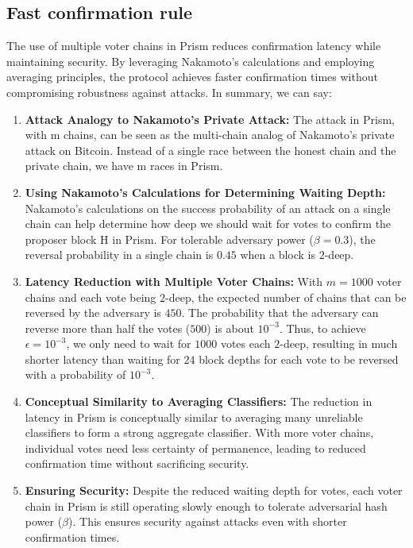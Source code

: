 \subsection{Fast confirmation rule}
The use of multiple voter chains in Prism reduces confirmation latency while maintaining security. By leveraging Nakamoto's calculations and employing averaging principles, the protocol achieves faster confirmation times without compromising robustness against attacks. In summary, we can say:
\begin{enumerate}
    \item \textbf{Attack Analogy to Nakamoto's Private Attack:} The attack in Prism, with m chains, can be seen as the multi-chain analog of Nakamoto's private attack on Bitcoin. Instead of a single race between the honest chain and the private chain, we have m races in Prism.
    \item \textbf{Using Nakamoto's Calculations for Determining Waiting Depth:} Nakamoto's calculations on the success probability of an attack on a single chain can help determine how deep we should wait for votes to confirm the proposer block H in Prism. For tolerable adversary power ($\beta = 0.3$), the reversal probability in a single chain is $0.45$ when a block is $2$-deep.
    \item \textbf{Latency Reduction with Multiple Voter Chains:} With $m = 1000$ voter chains and each vote being $2$-deep, the expected number of chains that can be reversed by the adversary is $450$. The probability that the adversary can reverse more than half the votes ($500$) is about $10^{-3}$. Thus, to achieve $\epsilon = 10^{-3}$, we only need to wait for $1000$ votes each $2$-deep, resulting in much shorter latency than waiting for $24$ block depths for each vote to be reversed with a probability of $10^{-3}$.
    \item \textbf{Conceptual Similarity to Averaging Classifiers:} The reduction in latency in Prism is conceptually similar to averaging many unreliable classifiers to form a strong aggregate classifier. With more voter chains, individual votes need less certainty of permanence, leading to reduced confirmation time without sacrificing security.
    \item \textbf{Ensuring Security:} Despite the reduced waiting depth for votes, each voter chain in Prism is still operating slowly enough to tolerate adversarial hash power ($\beta$). This ensures security against attacks even with shorter confirmation times.
\end{enumerate}
